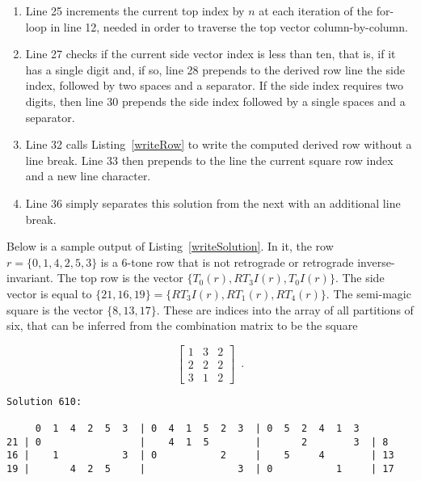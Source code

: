 \begin{enumerate}
\addtocounter{enumi}{6}
\item Line 25 increments the current top index by $n$ at each iteration of the for-loop in line 12, needed in order to traverse the top vector column-by-column.
\addtocounter{enumi}{1}
\item Line 27 checks if the current side vector index is less than ten, that is, if it has a single digit and, if so, line 28 prepends to the derived row line the side index, followed by two spaces and a separator. If the side index requires two digits, then line 30 prepends the side index followed by a single spaces and a separator.
\addtocounter{enumi}{4}
\item Line 32 calls Listing~\ref{writeRow} to write the computed derived row without a line break. Line 33 then prepends to the line the current square row index and a new line character.
\addtocounter{enumi}{3}
\item Line 36 simply separates this solution from the next with an additional line break.
\end{enumerate}

\begin{example}
	Below is a sample output of Listing~\ref{writeSolution}. In it, the row $r = \{0, 1, 4, 2, 5, 3\}$ is a 6-tone row that is not retrograde or retrograde inverse-invariant. The top row is the vector $\{T_0(r), RT_3I(r), T_0I(r)\}$. The side vector is equal to $\{21, 16, 19\} = \{RT_3I(r), RT_1(r), RT_4(r)\}$. The semi-magic square is the vector $\{8, 13, 17\}$. These are indices into the array of all partitions of six, that can be inferred from the combination matrix to be the square
	
	\begin{equation}
        \left[
        \begin{array}{c|c|c}
            1 & 3 & 2 \\
            \hline
            2 & 2 & 2 \\
            \hline
            3 & 1 & 2
        \end{array}
        \right] \enspace.
    \end{equation}
\end{example}

\begin{lstlisting}[basicstyle=\ttfamily\footnotesize,numbers=none]
Solution 610:

     0  1  4  2  5  3  | 0  4  1  5  2  3  | 0  5  2  4  1  3  
21 | 0                 |    4  1  5        |       2        3  | 8
16 |    1           3  | 0           2     |    5     4        | 13
19 |       4  2  5     |                3  | 0           1     | 17
\end{lstlisting}


